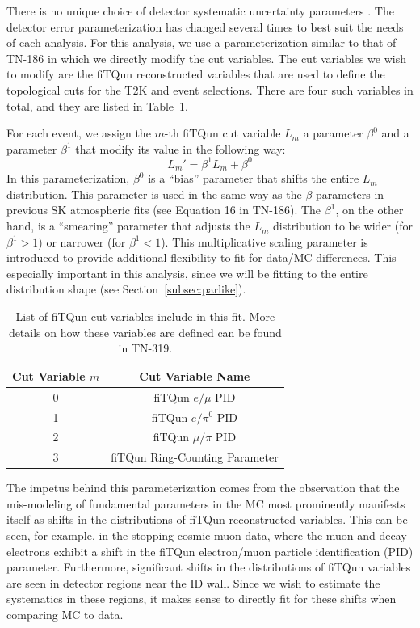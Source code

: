 There is no unique choice of detector systematic uncertainty parameters \ldsk.
The detector error parameterization has changed several times to best suit the
needs of each analysis. For this analysis, we use a parameterization
similar to that of TN-186 in which we directly modify the cut variables.  The
cut variables we wish to modify are the fiTQun reconstructed variables that are
used to define the topological cuts for the T2K \nue and \numu event
selections.  There are four such variables in total, and they are listed
in Table~\ref{tab:fqvars}.

For each event, we assign the $m$-th fiTQun cut variable $L_{m}$ a parameter
$\beta^{0}$ and a parameter $\beta^{1}$ that modify its value in the following
way:
%
\begin{equation}
  \label{eq:fqparmod}
  L_{m}' = \beta^{1} L_{m} + \beta^{0}
\end{equation}
%
In this parameterization, $\beta^{0}$ is a ``bias'' parameter that shifts the
entire $L_{m}$ distribution.  This parameter is used in the same way as the
$\beta$ parameters in previous SK atmospheric fits (see Equation 16 in TN-186).
The $\beta^{1}$, on the other hand, is a ``smearing'' parameter that adjusts
the $L_{m}$ distribution to be wider (for $\beta^{1} > 1$) or narrower (for
$\beta^{1} < 1$).  This multiplicative scaling parameter is introduced to
provide additional flexibility to fit for data/MC differences.  This especially
important in this analysis, since we will be fitting to the entire
distribution shape (see Section~\ref{subsec:parlike}).

\begin{table}
  \centering
  \begin{tabular}{c | c}
    \hline\hline
    Cut Variable $m$ & Cut Variable  Name \\
    \hline
    0 & fiTQun $e/\mu$ PID \\
    1 & fiTQun $e/\pi^{0}$ PID \\
    2 & fiTQun $\mu/\pi$ PID \\
    3 & fiTQun Ring-Counting Parameter \\
    \hline\hline
  \end{tabular}
  \caption{List of fiTQun cut variables include in this fit.  More details on
  how these variables are defined can be found in TN-319.}
  \label{tab:fqvars}
\end{table}

The impetus behind this parameterization comes from the observation that the
mis-modeling of fundamental parameters in the MC most prominently manifests
itself as shifts in the distributions of fiTQun reconstructed variables. This
can be seen, for example, in the stopping cosmic muon data, where the muon and
decay electrons exhibit a shift in the fiTQun electron/muon particle
identification (PID) parameter.  Furthermore, significant shifts in the
distributions of fiTQun variables are seen in detector regions near the ID
wall.  Since we wish to estimate the systematics in these regions, it makes
sense to directly fit for these shifts when comparing MC to data. 

